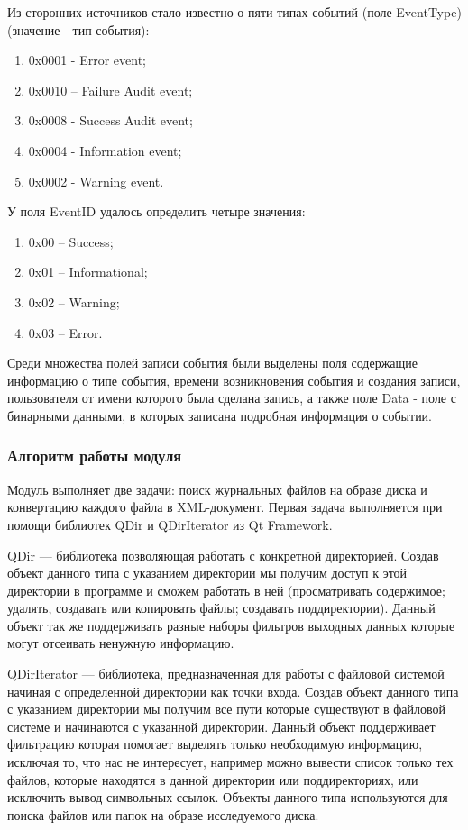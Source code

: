 Из сторонних источников \cite{evt} стало известно о пяти типах событий (поле EventType) (значение - тип события):

\begin{enumerate}
\item 0x0001 - Error event;
\item 0x0010 – Failure Audit event;
\item 0x0008 - Success Audit event;
\item 0x0004 - Information event;
\item 0x0002 - Warning event.
\end{enumerate}

У поля EventID удалось определить четыре значения:

\begin{enumerate}
\item 0x00 – Success;
\item 0x01 – Informational;
\item 0x02 – Warning;
\item 0x03 – Error.
\end{enumerate}

Среди множества полей записи события были выделены поля содержащие информацию о типе события, времени возникновения события и создания записи, пользователя от имени которого была сделана запись, а также поле Data - поле с бинарными данными, в которых записана подробная информация о событии.

\subsubsection{Алгоритм работы модуля}

Модуль выполняет две задачи: поиск журнальных файлов на образе диска и конвертацию каждого файла в XML-документ. Первая задача выполняется при помощи библиотек QDir и QDirIterator из Qt Framework.

QDir — библиотека позволяющая работать с конкретной директорией. Создав объект данного типа с указанием директории мы получим доступ к этой директории в программе и сможем работать в ней (просматривать содержимое; удалять, создавать или копировать файлы; создавать поддиректории). Данный объект так же поддерживать разные наборы фильтров выходных данных которые могут отсеивать ненужную информацию.

QDirIterator — библиотека, предназначенная для работы с файловой системой начиная с определенной директории как точки входа. Создав объект данного типа с указанием директории мы получим все пути которые существуют в файловой системе и начинаются с указанной директории. Данный объект поддерживает фильтрацию которая помогает выделять только необходимую информацию, исключая то, что нас не интересует, например можно вывести список только тех файлов, которые находятся в данной директории или поддиректориях, или исключить вывод символьных ссылок. Объекты данного типа используются для поиска файлов или папок на образе исследуемого диска.


